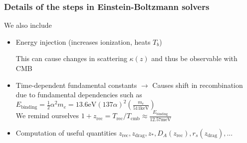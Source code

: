 \begin{frame}[fragile]
	\frametitle{Details of the steps in Einstein-Boltzmann solvers}

	We also include
	\begin{itemize}
		\item Energy injection (increases ionization, heats $T_b$)

		This can cause changes in scattering $\kappa(z)$ and thus be observable with CMB
		\item Time-dependent fundamental constants $\to$ Causes shift in recombination due to fundamental dependencies such as $E_\mathrm{binding} = \frac{1}{2}\alpha^2 m_e= 13.6\mathrm{eV} \left(137 \alpha\right)^2 \left(\frac{m_e}{511\mathrm{keV}}\right)$
		\\
		We remind ourselves $1+z_\mathrm{rec} = T_\mathrm{rec}/T_\mathrm{cmb} \approx \frac{E_\mathrm{binding}}{12.57\mathrm{meV}}$
		\item Computation of useful quantities $z_\mathrm{rec}, z_\mathrm{drag}, z_*, D_A(z_\mathrm{rec}), r_s(z_\mathrm{drag}), ...$
	\end{itemize}
\end{frame}






